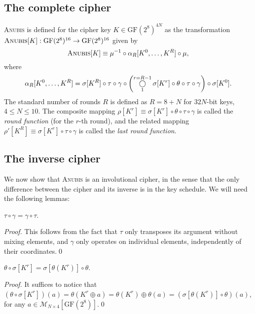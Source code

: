 \documentclass{llncs}
\newcommand{\GF}{\mathrm{GF}}
\newcommand{\matrices}[2]{\mathcal{M}_{#1 \times #2}[\GF(2^8)]}
\newcommand{\compository}{\mathop{\bigcirc}\displaylimits}
\begin{document}
\subsection{The complete cipher}

\textsc{Anubis} is defined for the cipher key $K \in
\GF(2^8)^{4N}$ as the transformation $\textsc{Anubis}[K]:
\GF(2^8)^{16} \rightarrow \GF(2^8)^{16}$ given by
\[
\textsc{Anubis}[K] \equiv \mu^{-1} \circ \alpha_R[K^0, \dots,
K^R] \circ \mu,
\]
where
\[
\alpha_R[K^0, \dots, K^R] = \sigma[K^R] \circ \tau \circ \gamma
\circ \left(\compository^{r=R-1}_1{\sigma[K^r] \circ \theta \circ
\tau \circ \gamma}\right) \circ \sigma[K^0].
\]
The standard number of rounds $R$ is defined as $R = 8 + N$ for
$32N$-bit keys, $4 \leqslant N \leqslant 10$. The composite
mapping $\rho[K^r] \equiv \sigma[K^r] \circ \theta \circ \tau
\circ \gamma$ is called the \emph{round function} (for the $r$-th
round), and the related mapping $\rho'[K^R] \equiv \sigma[K^r]
\circ \tau \circ \gamma$ is called the \emph{last round function}.

\subsection{The inverse cipher} \label{s_inverse}


We now show that \textsc{Anubis} is an involutional cipher,
in the sense that the only difference between the cipher and
its inverse is in the key schedule. We will need the following lemmas:

\begin{lemma}
$\tau \circ \gamma = \gamma \circ \tau$.
\end{lemma}
\begin{proof}
This follows from the fact that $\tau$ only transposes its
argument without mixing elements, and $\gamma$ only operates on
individual elements, independently of their coordinates.\qed
\end{proof}

\begin{lemma}
$\theta \circ \sigma[K^r] = \sigma[\theta(K^r)] \circ \theta$.
\end{lemma}
\begin{proof}
It suffices to notice that $(\theta \circ \sigma[K^r])(a) =
\theta(K^r \oplus a) = \theta(K^r) \oplus \theta(a) =
(\sigma[\theta(K^r)] \circ \theta)(a)$, for any $a \in
\matrices{N}{4}$.\qed
\end{proof}
\end{document}
